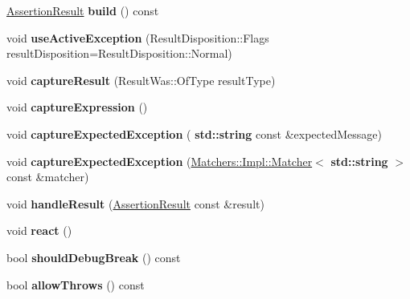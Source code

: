 \begin{DoxyCompactItemize}
\item 
\mbox{\label{class_catch_1_1_result_builder_a4fc96e7bb8b5f7119a8e79692ec97808}} 
\hyperlink{class_catch_1_1_assertion_result}{Assertion\+Result} {\bfseries build} () const
\item 
\mbox{\label{class_catch_1_1_result_builder_a5bbd2f14a678f3e8d0f791ac6d233d65}} 
void {\bfseries use\+Active\+Exception} (Result\+Disposition\+::\+Flags result\+Disposition=Result\+Disposition\+::\+Normal)
\item 
\mbox{\label{class_catch_1_1_result_builder_a10e467f7b7a4976e5d148b4d5066e8fd}} 
void {\bfseries capture\+Result} (Result\+Was\+::\+Of\+Type result\+Type)
\item 
\mbox{\label{class_catch_1_1_result_builder_af2ae2343965802eeeb0abbd4ea9d2d36}} 
void {\bfseries capture\+Expression} ()
\item 
\mbox{\label{class_catch_1_1_result_builder_a9ac96f6220c8dd8e4feee725c6228d77}} 
void {\bfseries capture\+Expected\+Exception} (\textbf{ std\+::string} const \&expected\+Message)
\item 
\mbox{\label{class_catch_1_1_result_builder_a7d443d632eaeabe2cb36218b8dcb7400}} 
void {\bfseries capture\+Expected\+Exception} (\hyperlink{struct_catch_1_1_matchers_1_1_impl_1_1_matcher}{Matchers\+::\+Impl\+::\+Matcher}$<$ \textbf{ std\+::string} $>$ const \&matcher)
\item 
\mbox{\label{class_catch_1_1_result_builder_ad8bb17e4ac590b75bf8630d8f3502f4e}} 
void {\bfseries handle\+Result} (\hyperlink{class_catch_1_1_assertion_result}{Assertion\+Result} const \&result)
\item 
\mbox{\label{class_catch_1_1_result_builder_a3085cdc46533d45bed6f652a2ac295c0}} 
void {\bfseries react} ()
\item 
\mbox{\label{class_catch_1_1_result_builder_a6f2b0dbcc6cc5e0a500ac45f2534e3e7}} 
bool {\bfseries should\+Debug\+Break} () const
\item 
\mbox{\label{class_catch_1_1_result_builder_a0428fd78ab9e8e6f1aca6855f20fc715}} 
bool {\bfseries allow\+Throws} () const
\end{DoxyCompactItemize}


